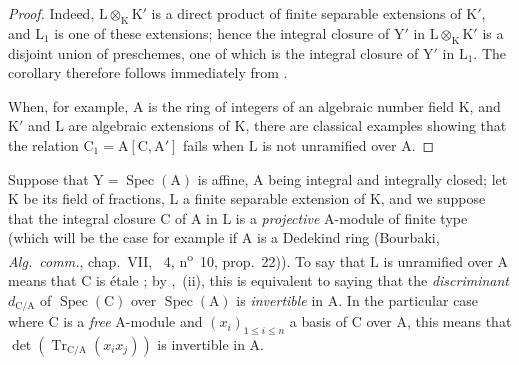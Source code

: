 \begin{proof}
Indeed, $\mathrm{L}\otimes_{\mathrm{K}}\mathrm{K}'$ is a direct product of finite separable extensions of $\mathrm{K}'$, and $\mathrm{L}_1$ is one of these extensions; hence the integral closure of $\mathrm{Y}'$ in $\mathrm{L}\otimes_{\mathrm{K}}\mathrm{K}'$ is a disjoint union of preschemes, one of which is the integral closure of $\mathrm{Y}'$ in $\mathrm{L}_1$.
The corollary therefore follows immediately from .

When, for example, $\mathrm{A}$ is the ring of integers of an algebraic number field $\mathrm{K}$, and $\mathrm{K}'$ and $\mathrm{L}$ are algebraic extensions of $\mathrm{K}$, there are classical examples showing that the relation $\mathrm{C}_1=\mathrm{A}[\mathrm{C},\mathrm{A}']$ fails when $\mathrm{L}$ is not unramified over $\mathrm{A}$.
\end{proof}

\begin{env}[18.10.15]
\label{IV.18.10.15}
Suppose that $\mathrm{Y}=\operatorname{Spec}(\mathrm{A})$ is affine, $\mathrm{A}$ being integral and integrally closed; let $\mathrm{K}$ be its field of fractions, $\mathrm{L}$ a finite separable extension of $\mathrm{K}$, and we suppose that the integral closure $\mathrm{C}$ of $\mathrm{A}$ in $\mathrm{L}$ is a \emph{projective} $\mathrm{A}$-module of finite type (which will be the case for example if $\mathrm{A}$ is a Dedekind ring (Bourbaki, \emph{Alg.\ comm.}, chap.~VII, \textsection~4, n\textsuperscript{o}~10, prop.~22)).
To say that $\mathrm{L}$ is unramified over $\mathrm{A}$ means that $\mathrm{C}$ is \'etale ; by ,~(ii), this is equivalent to saying that the \emph{discriminant} $d_{\mathrm{C}/\mathrm{A}}$ of $\operatorname{Spec}(\mathrm{C})$ over $\operatorname{Spec}(\mathrm{A})$ is \emph{invertible} in $\mathrm{A}$.
In the particular case where $\mathrm{C}$ is a \emph{free} $\mathrm{A}$-module and $(x_i)_{1\leq i\leq n}$ a basis of $\mathrm{C}$ over $\mathrm{A}$, this means that $\det(\operatorname{Tr}_{\mathrm{C}/\mathrm{A}}(x_ix_j))$ is invertible in $\mathrm{A}$.
\end{env}

